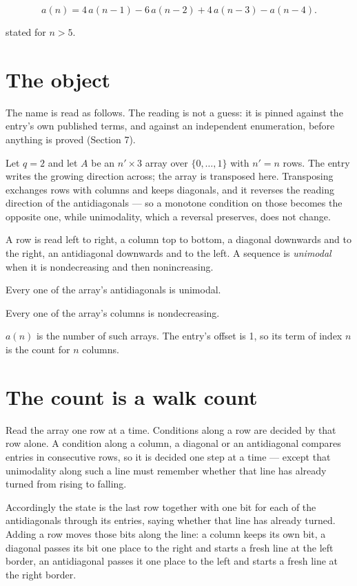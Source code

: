 \documentclass[11pt]{article}
\theoremstyle{definition}
\begin{document}
\[a(n) = 4\,a(n-1) - 6\,a(n-2) + 4\,a(n-3) - a(n-4).\]

stated for $n > 5$.

\section{The object}

The name is read as follows. The reading is not a guess: it is pinned against the entry's own published terms, and against an independent enumeration, before anything is proved (Section 7).

Let $q = 2$ and let $A$ be an $n' \times 3$ array over $\{0,\dots,1\}$ with $n' = n$ rows. The entry writes the growing direction across; the array is transposed here. Transposing exchanges rows with columns and keeps diagonals, and it reverses the reading direction of the antidiagonals --- so a monotone condition on those becomes the opposite one, while unimodality, which a reversal preserves, does not change.

A row is read left to right, a column top to bottom, a diagonal downwards and to the right, an antidiagonal downwards and to the left. A sequence is {\itshape unimodal} when it is nondecreasing and then nonincreasing.

Every one of the array's antidiagonals is unimodal.

Every one of the array's columns is nondecreasing.

$a(n)$ is the number of such arrays. The entry's offset is 1, so its term of index $n$ is the count for $n$ columns.

\section{The count is a walk count}

Read the array one row at a time. Conditions along a row are decided by that row alone. A condition along a column, a diagonal or an antidiagonal compares entries in consecutive rows, so it is decided one step at a time --- except that unimodality along such a line must remember whether that line has already turned from rising to falling.

Accordingly the state is the last row together with one bit for each of the antidiagonals through its entries, saying whether that line has already turned. Adding a row moves those bits along the line: a column keeps its own bit, a diagonal passes its bit one place to the right and starts a fresh line at the left border, an antidiagonal passes it one place to the left and starts a fresh line at the right border.
\end{document}
